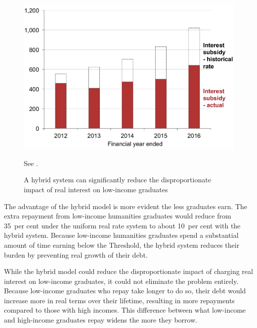 \documentclass{grattan}
\begin{document}
\begin{figure}%
\caption{A hybrid system can significantly reduce the disproportionate impact of real interest on low-income graduates}\label{fig:fig17-a-hybrid-system-can-signif-reduce-disprop-impact-of-real-interest-low-income-grads}


\includegraphics[page=17]{atlas/Chartpack.pdf}

{See .}
\end{figure}

The advantage of the hybrid model is more evident the less graduates earn.
The extra repayment from low-income humanities graduates would reduce from 35~per cent under the uniform real rate system to about 10~per cent with the hybrid system.
Because low-income humanities graduates spend a substantial amount of time earning below the \gls{Threshold}, the hybrid system reduces their burden by preventing real growth of their debt.

While the hybrid model could reduce the disproportionate impact of charging real interest on low-income graduates, it could not eliminate the problem entirely.
Because low-income graduates who repay take longer to do so, their debt would increase more in real terms over their lifetime, resulting in more repayments compared to those with high incomes.
This difference between what low-income and high-income graduates repay widens the more they borrow.
\end{document}
